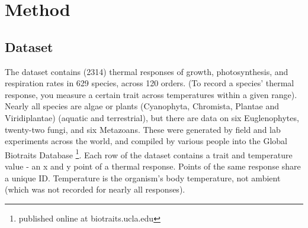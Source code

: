 \documentclass[11pt]{article}
\begin{document}





\section*{Method}
\subsection*{Dataset}
The dataset contains (2314) thermal responses of growth, photosynthesis, and respiration rates in 629 species, across 120 orders. (To record a species' thermal response, you measure a certain trait across temperatures within a given range). Nearly all species are algae or plants (Cyanophyta, Chromista, Plantae and Viridiplantae) (aquatic and terrestrial), but there are data on six Euglenophytes, twenty-two fungi, and six Metazoans. These were generated by field and lab experiments across the world, and compiled by various people into the Global Biotraits Database \footnote{published online at biotraits.ucla.edu}. Each row of the dataset contains a trait and temperature value - an x and y point of a thermal response. Points of the same response share a unique ID.
Temperature is the organism's body temperature, not ambient (which was not recorded for nearly all responses).
\end{document}
